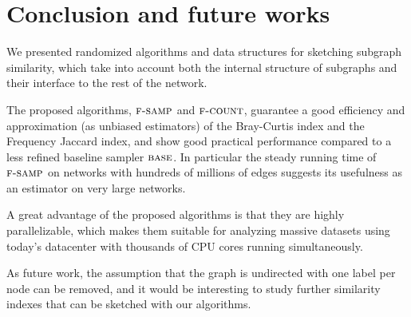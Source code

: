 \chapter{Conclusion and future works}
    
We presented randomized algorithms and data structures for sketching subgraph similarity, which take into account both the internal structure of subgraphs and their interface to the rest of the network. \medskip

The proposed algorithms, $\textsc{f-samp}$ and $\textsc{f-count}$, guarantee a good efficiency and approximation (as unbiased estimators) of the Bray-Curtis index and the Frequency Jaccard index, and show good practical performance compared to a less refined baseline sampler $\textsc{base}$. In particular the steady running time of $\textsc{f-samp}$ on networks with hundreds of millions of edges suggests its usefulness as an estimator on very large networks.\medskip

A great advantage of the proposed algorithms is that they are highly parallelizable, which makes them suitable for analyzing massive datasets using today's datacenter with thousands of CPU cores running simultaneously.\medskip

As future work, the assumption that the graph is undirected with one label per node can be removed, and it would be interesting to study further similarity indexes that can be sketched with our algorithms.